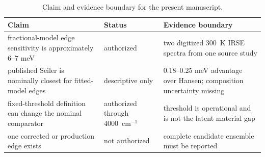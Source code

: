 \begin{table}[t]
\centering
\caption{Claim and evidence boundary for the present manuscript.}
\label{tab:claim-boundaries}
\begin{tabular}{p{}p{}p{}}
\toprule
Claim & Status & Evidence boundary \\
\midrule
fractional-model edge sensitivity is approximately 6--7 meV & authorized & two digitized 300~K IRSE spectra from one source study \\
published Seiler is nominally closest for fitted-model edges & descriptive only & 0.18--0.25 meV advantage over Hansen; composition uncertainty missing \\
fixed-threshold definition can change the nominal comparator & authorized through 4000~cm$^{-1}$ & threshold is operational and is not the latent material gap \\
one corrected or production edge exists & not authorized & complete candidate ensemble must be reported \\
\bottomrule
\end{tabular}
\end{table}

